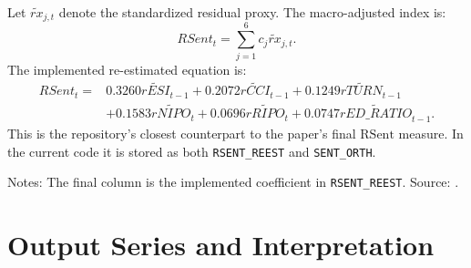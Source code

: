 \documentclass[12pt]{article}
\begin{document}
Let \(\widetilde{r x}_{j,t}\) denote the standardized residual proxy. The macro-adjusted index is:
\[
RSent_t = \sum_{j=1}^{6} c_j \widetilde{r x}_{j,t}.
\]
The implemented re-estimated equation is:
\begin{align*}
RSent_t ={}& 0.3260\widetilde{rESI}_{t-1}
 + 0.2072\widetilde{rCCI}_{t-1}
 + 0.1249\widetilde{rTURN}_{t-1} \\
& + 0.1583\widetilde{rNIPO}_{t}
 + 0.0696\widetilde{rRIPO}_{t}
 + 0.0747\widetilde{rED\_RATIO}_{t-1}.
\end{align*}
This is the repository's closest counterpart to the paper's final \(\mathrm{RSent}\) measure. In the current code it is stored as both \texttt{RSENT\_REEST} and \texttt{SENT\_ORTH}.

\begin{table}[htbp]
\centering
\caption{Weighted Score Coefficients for the Macro-adjusted Index}
\label{tab:rsent_coefficients}
\begin{minipage}{0.95\textwidth}
\footnotesize
Notes: The final column is the implemented coefficient in \texttt{RSENT\_REEST}. Source: .
\end{minipage}
\end{table}

\section{Output Series and Interpretation}
\end{document}
